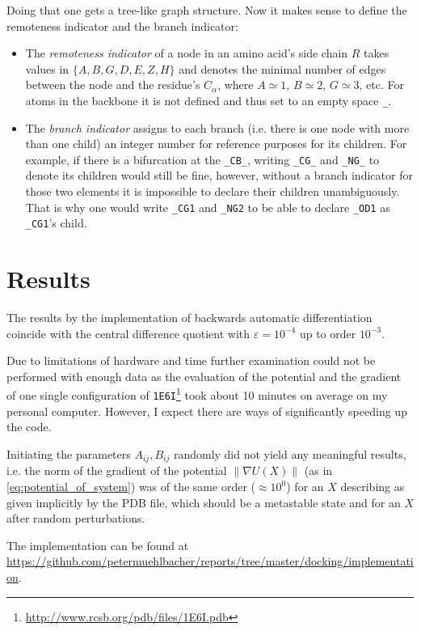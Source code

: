 \documentclass[12pt]{article}
\theoremstyle{definition}\newtheorem*{definition}{Definition}
\theoremstyle{definition}\newtheorem*{remark}{Remark}
\begin{document}
Doing that one gets a tree-like graph structure. Now it makes sense to define the remoteness indicator and the branch indicator:

\begin{itemize}
	\item The \textit{remoteness indicator} of a node in an amino acid's side chain $R$ takes values in $\{A,B,G,D,E,Z,H\}$ and denotes the minimal number of edges between the node and the residue's $C_\alpha$, where $A\simeq 1$, $B\simeq 2$, $G\simeq 3$, etc. For atoms in the backbone it is not defined and thus set to an empty space \texttt{\_}.
	\item The \textit{branch indicator} assigns to each branch (i.e. there is one node with more than one child) an integer number for reference purposes for its children. For example, if there is a bifurcation at the \texttt{\_CB\_}, writing \texttt{\_CG\_} and \texttt{\_NG\_} to denote its children would still be fine, however, without a branch indicator for those two elements it is impossible to declare their children unambiguously. That is why one would write \texttt{\_CG1} and \texttt{\_NG2} to be able to declare \texttt{\_OD1} as \texttt{\_CG1}'s child.
\end{itemize}

\section{Results}
The results by the implementation of backwards automatic differentiation coincide with the central difference quotient with $\varepsilon = 10^{-4}$ up to order $10^{-3}$.

Due to limitations of hardware and time further examination could not be performed with enough data as the evaluation of the potential and the gradient of one single configuration of \texttt{1E6I}\footnote{\url{http://www.rcsb.org/pdb/files/1E6I.pdb}} took about 10 minutes on average on my personal computer. However, I expect there are ways of significantly speeding up the code.

Initiating the parameters $A_{ij},B_{ij}$ randomly did not yield any meaningful results, i.e. the norm of the gradient of the potential $\|\nabla U(X)\|$ (as in \eqref{eq:potential_of_system}) was of the same order ($\approx 10^0$) for an $X$ describing as given implicitly by the PDB file, which should be a metastable state and for an $X$ after random perturbations.

The implementation can be found at \\\url{https://github.com/petermuehlbacher/reports/tree/master/docking/implementation}.
\end{document}

